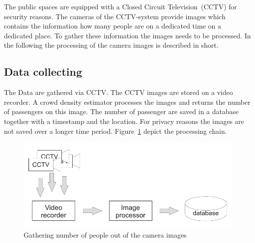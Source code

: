 The public spaces are equipped with a Closed Circuit Television~(CCTV) for security reasons. The cameras of the CCTV-system provide images which contains the information how many people are on a dedicated time on a dedicated place. To gather these information the images needs to be processed. In the following the processing of the camera images is described in short.

\subsection{Data collecting}
\label{subsec:data}

The Data are gathered via CCTV. The CCTV images are stored on a video recorder. A crowd density estimator processes the images and returns the number of passengers on this image. The number of passenger are saved in a database together with a timestamp and the location. For privacy reasons the images are not saved over a longer time period. Figure~\ref{fig:crowdDensityEstimator} depict the processing chain.

\begin{figure}[htb]
  \centering
  \includegraphics[width=\linewidth]{imageProcessing.pdf} 
  \caption{Gathering number of people out of the camera images}
  \label{fig:crowdDensityEstimator}
\end{figure}
